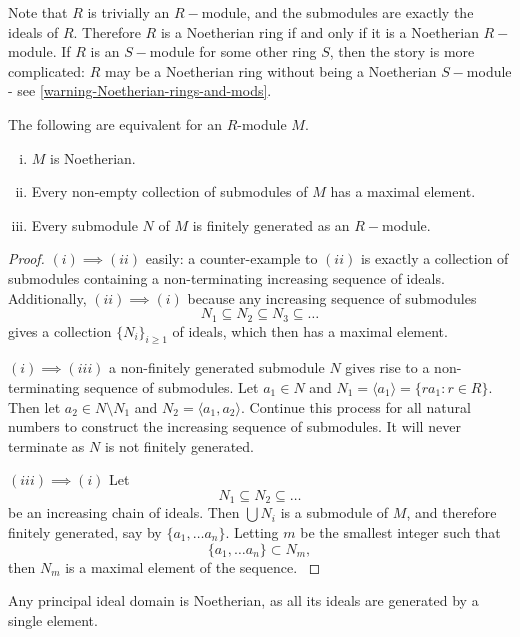 Note that $R$ is trivially an $R-$module, and the submodules are exactly the ideals of $R$. Therefore $R$ is a Noetherian ring if and only if it is a Noetherian $R-$module. If $R$ is an $S-$module for some other ring $S$, then the story is more complicated: $R$ may be a Noetherian ring without being a Noetherian $S-$module - see \cref{warning-Noetherian-rings-and-mods}.

\begin{proposition}\label{noetherian-module-equivalences}
The following are equivalent for an $R$-module $M$.
\begin{enumerate}[(i)]
    \item $M$ is Noetherian.
    \item Every non-empty collection of submodules of $M$ has a maximal element.
    \item Every submodule $N$ of $M$ is finitely generated as an $R-$module.
\end{enumerate}
\end{proposition}
\begin{proof}
$(i)\implies (ii)$ easily: a counter-example to $(ii)$ is exactly a collection of submodules containing a non-terminating increasing sequence of ideals. Additionally, $(ii)\implies (i)$ because any increasing sequence of submodules
$$N_1\subseteq N_2\subseteq N_3 \subseteq \dots$$
gives a collection $\{N_i\}_{i\geq 1}$ of ideals, which then has a maximal element.

$(i)\implies (iii)$ a non-finitely generated submodule $N$ gives rise to a non-terminating sequence of submodules. Let $a_1\in N$ and $N_1=\langle a_1\rangle=\{ra_1:r\in R\}$. Then let $a_2\in N\setminus N_1$ and $N_2=\langle a_1,a_2\rangle$. Continue this process for all natural numbers to construct the increasing sequence of submodules. It will never terminate as $N$ is not finitely generated.

$(iii)\implies (i)$ Let $$N_1\subseteq N_2\subseteq \dots$$ be an increasing chain of ideals. Then $\bigcup N_i$ is a submodule of $M$, and therefore finitely generated, say by $\{a_1,\dots a_n\}$. Letting $m$ be the smallest integer such that $$\{a_1,\dots a_n\}\subset N_m,$$ then $N_m$ is a maximal element of the sequence.
\cite{Wright}
\end{proof}

\begin{example}
Any principal ideal domain is Noetherian, as all its ideals are generated by a single element.
\end{example}

